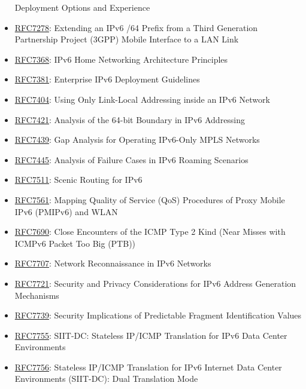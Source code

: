\documentclass[
]{article}
\begin{document}
\begin{itemize}
  Deployment Options and Experience
\item
  \href{https://www.rfc-editor.org/info/rfc7278}{RFC7278}: Extending an
  IPv6 /64 Prefix from a Third Generation Partnership Project (3GPP)
  Mobile Interface to a LAN Link
\item
  \href{https://www.rfc-editor.org/info/rfc7368}{RFC7368}: IPv6 Home
  Networking Architecture Principles
\item
  \href{https://www.rfc-editor.org/info/rfc7381}{RFC7381}: Enterprise
  IPv6 Deployment Guidelines
\item
  \href{https://www.rfc-editor.org/info/rfc7404}{RFC7404}: Using Only
  Link-Local Addressing inside an IPv6 Network
\item
  \href{https://www.rfc-editor.org/info/rfc7421}{RFC7421}: Analysis of
  the 64-bit Boundary in IPv6 Addressing
\item
  \href{https://www.rfc-editor.org/info/rfc7439}{RFC7439}: Gap Analysis
  for Operating IPv6-Only MPLS Networks
\item
  \href{https://www.rfc-editor.org/info/rfc7445}{RFC7445}: Analysis of
  Failure Cases in IPv6 Roaming Scenarios
\item
  \href{https://www.rfc-editor.org/info/rfc7511}{RFC7511}: Scenic
  Routing for IPv6
\item
  \href{https://www.rfc-editor.org/info/rfc7561}{RFC7561}: Mapping
  Quality of Service (QoS) Procedures of Proxy Mobile IPv6 (PMIPv6) and
  WLAN
\item
  \href{https://www.rfc-editor.org/info/rfc7690}{RFC7690}: Close
  Encounters of the ICMP Type 2 Kind (Near Misses with ICMPv6 Packet Too
  Big (PTB))
\item
  \href{https://www.rfc-editor.org/info/rfc7707}{RFC7707}: Network
  Reconnaissance in IPv6 Networks
\item
  \href{https://www.rfc-editor.org/info/rfc7721}{RFC7721}: Security and
  Privacy Considerations for IPv6 Address Generation Mechanisms
\item
  \href{https://www.rfc-editor.org/info/rfc7739}{RFC7739}: Security
  Implications of Predictable Fragment Identification Values
\item
  \href{https://www.rfc-editor.org/info/rfc7755}{RFC7755}: SIIT-DC:
  Stateless IP/ICMP Translation for IPv6 Data Center Environments
\item
  \href{https://www.rfc-editor.org/info/rfc7756}{RFC7756}: Stateless
  IP/ICMP Translation for IPv6 Internet Data Center Environments
  (SIIT-DC): Dual Translation Mode

\end{itemize}
\end{document}
